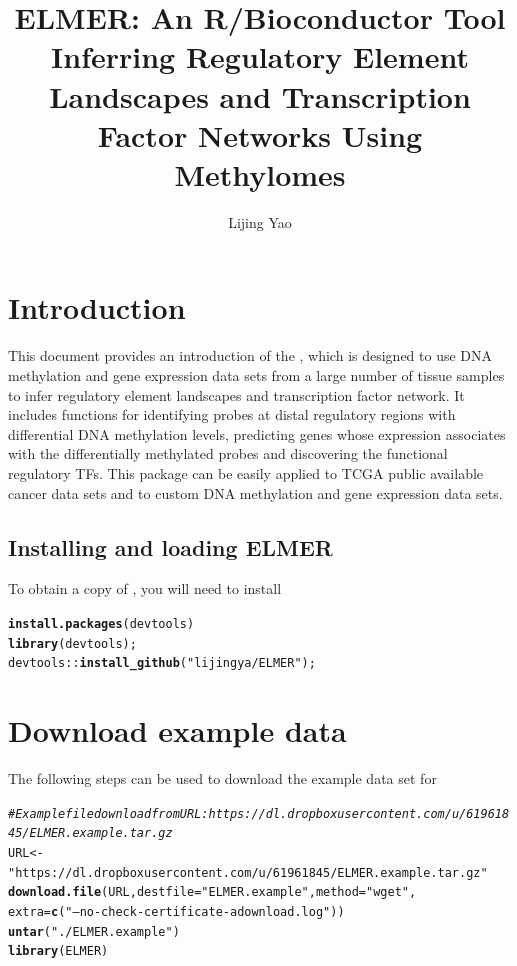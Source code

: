 \documentclass{article}\usepackage[]{graphicx}\usepackage[usenames,dvipsnames]{color}
\title{ELMER: An R/Bioconductor Tool \\
Inferring Regulatory Element Landscapes and Transcription Factor Networks Using Methylomes}
\author {Lijing Yao}
\makeatletter
\newcommand{\hlstr}[1]{\textcolor[rgb]{0.192,0.494,0.8}{#1}}%
\newcommand{\hlcom}[1]{\textcolor[rgb]{0.678,0.584,0.686}{\textit{#1}}}%
\newcommand{\hlopt}[1]{\textcolor[rgb]{0,0,0}{#1}}%
\newcommand{\hlstd}[1]{\textcolor[rgb]{0.345,0.345,0.345}{#1}}%
\newcommand{\hlkwb}[1]{\textcolor[rgb]{0.69,0.353,0.396}{#1}}%
\newcommand{\hlkwc}[1]{\textcolor[rgb]{0.333,0.667,0.333}{#1}}%
\newcommand{\hlkwd}[1]{\textcolor[rgb]{0.737,0.353,0.396}{\textbf{#1}}}%
\newenvironment{kframe}{%
 \def\at@end@of@kframe{}%
 \ifinner\ifhmode%
  \def\at@end@of@kframe{\end{minipage}}%
  \begin{minipage}{\columnwidth}%
 \fi\fi%
 \def\FrameCommand##1{\hskip\@totalleftmargin \hskip-\fboxsep
 \colorbox{shadecolor}{##1}\hskip-\fboxsep
     \hskip-\linewidth \hskip-\@totalleftmargin \hskip\columnwidth}%
 \MakeFramed {\advance\hsize-\width
   \@totalleftmargin\z@ \linewidth\hsize
   \@setminipage}}%
 {\par\unskip\endMakeFramed%
 \at@end@of@kframe}
\newenvironment{knitrout}{}{} %
\makeatother
\begin{document}
\maketitle

\tableofcontents
\section{Introduction}
This document provides an introduction of the , which is designed 
to use DNA methylation and gene expression data sets from a large number
of tissue samples to infer regulatory element landscapes and transcription factor network.
It includes functions for identifying probes at distal regulatory regions with differential 
DNA methylation levels, predicting genes whose expression associates with the differentially
methylated probes and discovering the functional regulatory TFs. This package can be easily
applied to TCGA public available cancer data sets and to custom DNA methylation 
and gene expression data sets. 

\subsection{Installing and loading ELMER}
To obtain a copy of , you will need to install 
\begin{knitrout}
\color{fgcolor}\begin{kframe}
\begin{alltt}
\hlkwd{install.packages}\hlstd{(devtools)}
\hlkwd{library}\hlstd{(devtools);}
\hlstd{devtools}\hlopt{::}\hlkwd{install_github}\hlstd{(}\hlstr{"lijingya/ELMER"}\hlstd{);}
\end{alltt}
\end{kframe}
\end{knitrout}

\section{Download example data}
The following steps can be used to download the example data set for 


\begin{knitrout}
\color{fgcolor}\begin{kframe}
\begin{alltt}
\hlcom{#Example file download from URL: https://dl.dropboxusercontent.com/u/61961845/ELMER.example.tar.gz}
\hlstd{URL} \hlkwb{<-} \hlstr{"https://dl.dropboxusercontent.com/u/61961845/ELMER.example.tar.gz"}
\hlkwd{download.file}\hlstd{(URL,}\hlkwc{destfile} \hlstd{=} \hlstr{"ELMER.example"}\hlstd{,}\hlkwc{method}\hlstd{=} \hlstr{"wget"}\hlstd{,}
              \hlkwc{extra} \hlstd{=} \hlkwd{c}\hlstd{(}\hlstr{"--no-check-certificate -a download.log"}\hlstd{))}
\hlkwd{untar}\hlstd{(}\hlstr{"./ELMER.example"}\hlstd{)}
\hlkwd{library}\hlstd{(ELMER)}
\end{alltt}
\end{kframe}
\end{knitrout}
\end{document}
